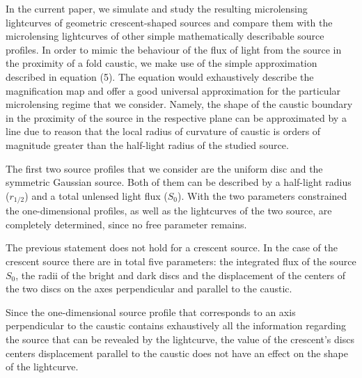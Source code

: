 \documentclass[usenatbib]{mn2e}
\begin{document}
In the current paper, we simulate and study the resulting microlensing lightcurves of geometric crescent-shaped sources 
and compare them with the microlensing lightcurves of other simple mathematically describable source profiles. 
In order to mimic the behaviour of the flux of light from the source in the proximity of a fold caustic, 
we make use of the simple approximation described in equation (5). 
The equation would exhaustively describe the magnification map and offer a good universal approximation for the 
particular microlensing regime that we consider. 
Namely, the shape of the caustic boundary in the proximity of the source in the respective plane can be approximated by
 a line due to reason that the local radius of curvature of caustic is orders of magnitude greater than the half-light
 radius of the studied source. 

The first two source profiles that we consider are the uniform disc and the symmetric Gaussian source. 
Both of them can be described by a half-light radius ($r_{1/2}$) and a total unlensed light flux ($S_0$). 
With the two parameters constrained the one-dimensional profiles, as well as the lightcurves of the 
two source, are completely determined, since no free parameter remains. 

The previous statement does not hold for a crescent source.
In the case of the crescent source there are in total five parameters: the integrated flux of the source $S_0$,
 the radii of the bright and dark discs and the displacement of the centers of the two discs on the axes perpendicular and parallel to the caustic. 


Since the one-dimensional source profile that corresponds to an 
axis perpendicular to the caustic contains exhaustively all the 
information regarding the source that can be revealed by the lightcurve, 
the value of the crescent's discs centers displacement parallel to the caustic 
does not have an effect on the shape of the lightcurve. 
\end{document}
